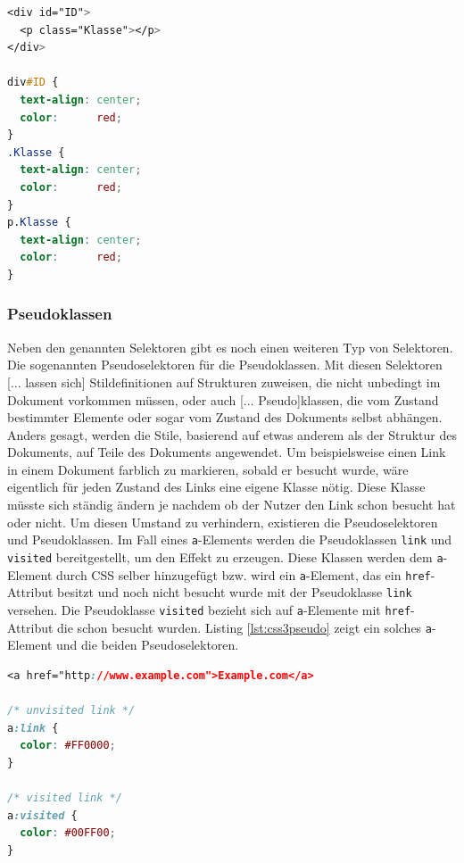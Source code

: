 \vspace{1em}
\begin{lstlisting}[language=CSS, caption=CSS3 Klassen- und ID-Selektoren, label=lst:css3idclass]
<div id="ID">
  <p class="Klasse"></p>
</div>

div#ID {
  text-align: center;
  color:      red;
}
.Klasse {
  text-align: center;
  color:      red;
}
p.Klasse {
  text-align: center;
  color:      red;
}
\end{lstlisting}
	
\subsubsection{Pseudoklassen} Neben den genannten Selektoren gibt es noch einen weiteren Typ von Selektoren. Die sogenannten Pseudoselektoren für die Pseudoklassen. \glqq Mit diesen Selektoren [... lassen sich] Stildefinitionen auf Strukturen zuweisen, die nicht unbedingt im Dokument vorkommen müssen, oder auch [... Pseudo]klassen, die vom Zustand bestimmter Elemente oder sogar vom Zustand des Dokuments selbst abhängen. Anders gesagt, werden die Stile, basierend auf etwas anderem als der Struktur des Dokuments, auf Teile des Dokuments angewendet.\grqq{}\cite[S.53ff]{MeyeCasc2005} Um beispielsweise einen Link in einem Dokument farblich zu markieren, sobald er besucht wurde, wäre eigentlich für jeden Zustand des Links eine eigene Klasse nötig. Diese Klasse müsste sich ständig ändern je nachdem ob der Nutzer den Link schon besucht hat oder nicht. Um diesen Umstand zu verhindern, existieren die Pseudoselektoren und Pseudoklassen. Im Fall eines \texttt{a}-Elements werden die Pseudoklassen \texttt{link} und \texttt{visited} bereitgestellt, um den Effekt zu erzeugen. Diese Klassen werden dem \texttt{a}-Element durch CSS selber hinzugefügt bzw. wird ein \texttt{a}-Element, das ein \texttt{href}-Attribut besitzt und noch nicht besucht wurde mit der Pseudoklasse \texttt{link} versehen. Die Pseudoklasse \texttt{visited} bezieht sich auf \texttt{a}-Elemente mit \texttt{href}-Attribut die schon besucht wurden. Listing \ref{lst:css3pseudo} zeigt ein solches \texttt{a}-Element und die beiden Pseudoselektoren.

\vspace{1em}
\begin{lstlisting}[language=CSS, caption=CSS3 Pseudoklassen und -selektoren, label=lst:css3pseudo]
<a href="http://www.example.com">Example.com</a>

/* unvisited link */
a:link {
  color: #FF0000;
}

/* visited link */
a:visited {
  color: #00FF00;
}
\end{lstlisting}

